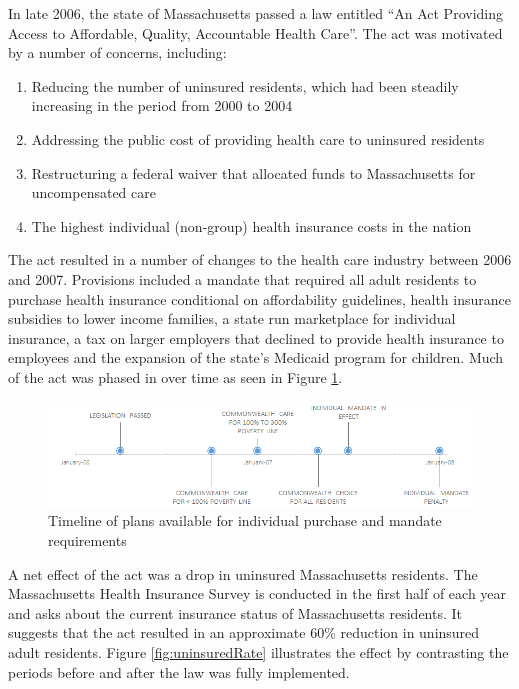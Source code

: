 In late 2006, the state of Massachusetts passed a law entitled ``An Act Providing Access to Affordable, Quality, Accountable Health Care''. The act was motivated by a number of concerns, including:

\begin{enumerate}
\item Reducing the number of uninsured residents, which had been steadily increasing in the period from 2000 to 2004 \cite{bisweek}
\item Addressing the public cost of providing health care to uninsured residents \cite{npr}
\item Restructuring a federal waiver that allocated funds to Massachusetts for uncompensated care \cite{heritage}
\item The highest individual (non-group) health insurance costs in the nation \cite{gruber_mass}
\end{enumerate}

The act resulted in a number of changes to the health care industry between 2006 and 2007. Provisions included a mandate that required all adult residents to purchase health insurance conditional on affordability guidelines, health insurance subsidies to lower income families, a state run marketplace for individual insurance, a tax on larger employers that declined to provide health insurance to employees and the expansion of the state's Medicaid program for children. Much of the act was phased in over time as seen in Figure \ref{fig:reformTimeline}.

\begin{figure}[h]
	\centering
	\includegraphics[width=\textwidth]{resources/timeline}
	\caption{Timeline of plans available for individual purchase and mandate requirements}
	\label{fig:reformTimeline}
\end{figure}

A net effect of the act was a drop in uninsured Massachusetts residents. The Massachusetts Health Insurance Survey is conducted in the first half of each year and asks about the current insurance status of Massachusetts residents. It suggests that the act resulted in an approximate 60\% reduction in uninsured adult residents. Figure \ref{fig:uninsuredRate} illustrates the effect by contrasting the periods before and after the law was fully implemented. 

